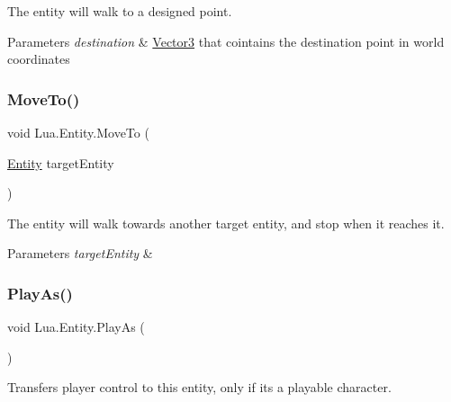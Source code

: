 The entity will walk to a designed point. 


\begin{DoxyParams}{Parameters}
{\em destination} & \mbox{\hyperlink{class_lua_1_1_vector3}{Vector3}} that cointains the destination point in world coordinates\\
\hline
\end{DoxyParams}
\mbox{\label{class_lua_1_1_entity_a307f39e2316f0c4246604ba5ce5b749e}} 
\subsubsection{\texorpdfstring{MoveTo()}{MoveTo()}\hspace{0.1cm}{\footnotesize\ttfamily [2/2]}}
{\footnotesize\ttfamily void Lua.\+Entity.\+Move\+To (\begin{DoxyParamCaption}\item[{\mbox{\hyperlink{class_lua_1_1_entity}{Entity}}}]{target\+Entity }\end{DoxyParamCaption})}



The entity will walk towards another target entity, and stop when it reaches it. 


\begin{DoxyParams}{Parameters}
{\em target\+Entity} & \\
\hline
\end{DoxyParams}
\mbox{\label{class_lua_1_1_entity_aa3ec8ca2693205f43b8e1e620b209018}} 
\subsubsection{\texorpdfstring{PlayAs()}{PlayAs()}}
{\footnotesize\ttfamily void Lua.\+Entity.\+Play\+As (\begin{DoxyParamCaption}{ }\end{DoxyParamCaption})}



Transfers player control to this entity, only if it\textquotesingle{}s a playable character. 

\mbox{\label{class_lua_1_1_entity_a32545d25ff6935a006bdb6b5ad45ad9a}} 
